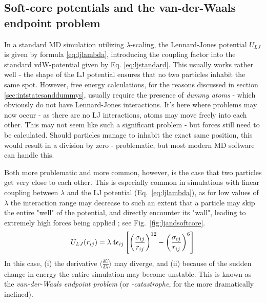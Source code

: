\documentclass[oneside]{scrreprt}
\begin{document}
\subsection{Soft-core potentials and the van-der-Waals endpoint problem} \label{sec:vdwproblem}
In a standard MD simulation utilizing $\lambda$-scaling, the Lennard-Jones potential $U_{LJ}$ is given by formula \ref{eq:ljlambda}, introducing the coupling factor into the standard vdW-potential given by Eq. \ref{eq:ljstandard}. This usually works rather well -  the shape of the LJ potential ensures that no two  particles inhabit the same spot. However, free energy calculations, for the reasons discussed in section \ref{sec:intstatesanddummys}, usually require the presence of \textit{dummy atoms} - which obviously do not have Lennard-Jones interactions. It's here where problems may now occur -  as there are no LJ interactions, atoms may move freely into each other. This may not seem like such a significant problem - but forces still need to be calculated. Should particles manage to inhabit the exact same position, this would result in a division by zero - problematic, but most modern MD software can handle this. 


Both more problematic and more common, however, is the case that two particles get very close to each other. This is especially common in simulations with linear coupling between $\lambda$ and the LJ potential (Eq.~\ref{eq:ljlambda}), as for low values of $\lambda$ the interaction range may decrease to such an extent that a particle may skip the entire "well" of the potential, and directly encounter its "wall", leading to extremely high forces being applied \cite{Beutler1994Jun,boresch_avoiding_2011}; see Fig.~\ref{fig:ljandsoftcore}. 
\begin{equation}
U_{LJ}(r_{ij})=\lambda\,4\epsilon_{ij}\left[\left(\frac{\sigma_{ij}}{r_{ij}}\right)^{12} - \left(\frac{\sigma_{ij}}{r_{ij}}\right)^6\right] \label{eq:ljlambda} \\
\end{equation}
In this case, (i) the derivative $\langle \frac{\delta U}{\delta\lambda} \rangle$ may diverge, and (ii) because of the sudden change in energy the entire simulation may become unstable. This is known as the \textit{van-der-Waals endpoint problem} (or \textit{-catastrophe}, for the more dramatically inclined).
\end{document}
